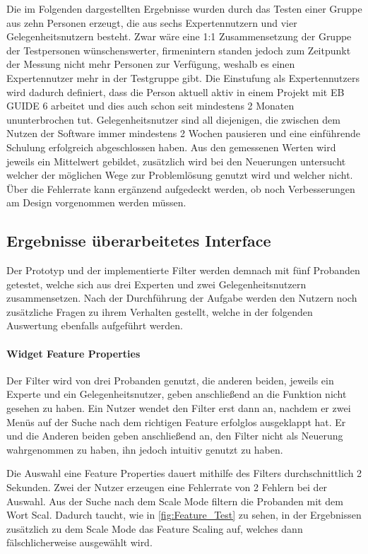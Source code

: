 Die im Folgenden dargestellten Ergebnisse wurden durch das Testen einer Gruppe aus zehn Personen erzeugt, die aus sechs Expertennutzern und vier Gelegenheitsnutzern besteht.
Zwar wäre eine 1:1 Zusammensetzung der Gruppe der Testpersonen wünschenswerter, firmenintern standen jedoch zum Zeitpunkt der Messung nicht mehr Personen zur Verfügung, weshalb es einen Expertennutzer mehr in der Testgruppe gibt.
Die Einstufung als Expertennutzers wird dadurch definiert, dass die Person aktuell aktiv in einem Projekt mit EB GUIDE 6 arbeitet und dies auch schon seit mindestens 2 Monaten ununterbrochen tut.
Gelegenheitsnutzer sind all diejenigen, die zwischen dem Nutzen der Software immer mindestens 2 Wochen pausieren und eine einführende Schulung erfolgreich abgeschlossen haben.
Aus den gemessenen Werten wird jeweils ein Mittelwert gebildet, zusätzlich wird bei den Neuerungen untersucht welcher der möglichen Wege zur Problemlösung genutzt wird und welcher nicht.
Über die Fehlerrate kann ergänzend aufgedeckt werden, ob noch Verbesserungen am Design vorgenommen werden müssen.

\subsection{Ergebnisse überarbeitetes Interface}
Der Prototyp und der implementierte Filter werden demnach mit fünf Probanden getestet, welche sich aus drei Experten und zwei Gelegenheitsnutzern zusammensetzen.
Nach der Durchführung der Aufgabe werden den Nutzern noch zusätzliche Fragen zu ihrem Verhalten gestellt, welche in der folgenden Auswertung ebenfalls aufgeführt werden.

\paragraph{Widget Feature Properties}
Der Filter wird von drei Probanden genutzt, die anderen beiden, jeweils ein Experte und ein Gelegenheitsnutzer, geben anschließend an die Funktion nicht gesehen zu haben.
Ein Nutzer wendet den Filter erst dann an, nachdem er zwei Menüs auf der Suche nach dem richtigen Feature erfolglos ausgeklappt hat.
Er und die Anderen beiden geben anschließend an, den Filter nicht als Neuerung wahrgenommen zu haben, ihn jedoch intuitiv genutzt zu haben.

Die Auswahl eine Feature Properties dauert mithilfe des Filters durchschnittlich 2 Sekunden.
Zwei der Nutzer erzeugen eine Fehlerrate von 2 Fehlern bei der Auswahl.
Aus der Suche nach dem Scale Mode filtern die Probanden mit dem Wort \glqq Scal\grqq{}.
Dadurch taucht, wie in \ref{fig:Feature_Test} zu sehen, in der Ergebnissen zusätzlich zu dem Scale Mode das Feature Scaling auf, welches dann fälschlicherweise ausgewählt wird.

